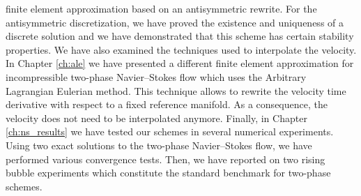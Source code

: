 finite element approximation based on an antisymmetric rewrite. For the
antisymmetric discretization, we have proved the existence and uniqueness of a
discrete solution and we have demonstrated that this scheme has certain
stability properties. We have also examined the techniques used to interpolate
the velocity. In Chapter \ref{ch:ale} we have presented a different finite
element approximation for incompressible two-phase Navier--Stokes flow which
uses the Arbitrary Lagrangian Eulerian method. This technique allows to
rewrite the velocity time derivative with respect to a fixed reference
manifold. As a consequence, the velocity does not need to be interpolated
anymore. Finally, in Chapter \ref{ch:ns_results} we have tested our schemes in
several numerical experiments. Using two exact solutions to the two-phase
Navier--Stokes flow, we have performed various convergence tests. Then, we have
reported on two rising bubble experiments which constitute the standard
benchmark for two-phase schemes.